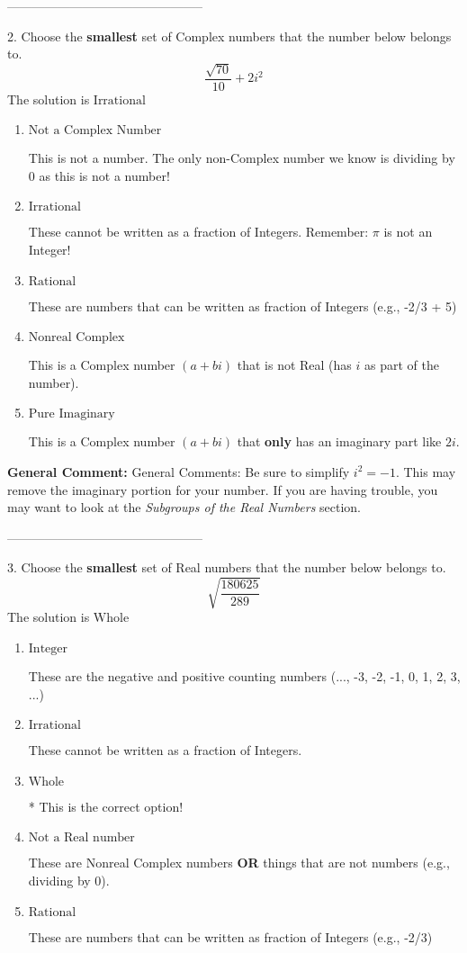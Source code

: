 \documentclass{extbook}[14pt]
\begin{document}
-----------------------------------------------

2. Choose the \textbf{smallest} set of Complex numbers that the number below belongs to.
\[ \frac{\sqrt{70}}{10}+2i^2 \] 
The solution is $ \text{Irrational} $ 

\begin{enumerate}[label=\Alph*.] 
\item $ \text{Not a Complex Number} $ 

 This is not a number. The only non-Complex number we know is dividing by 0 as this is not a number! 
\item $ \text{Irrational} $ 

 These cannot be written as a fraction of Integers. Remember: $\pi$ is not an Integer! 
\item $ \text{Rational} $ 

 These are numbers that can be written as fraction of Integers (e.g., -2/3 + 5) 
\item $ \text{Nonreal Complex} $ 

 This is a Complex number $(a+bi)$ that is not Real (has $i$ as part of the number). 
\item $ \text{Pure Imaginary} $ 

 This is a Complex number $(a+bi)$ that \textbf{only} has an imaginary part like $2i$. 
\end{enumerate} 
 
\textbf{General Comment:} General Comments: Be sure to simplify $i^2 = -1$. This may remove the imaginary portion for your number. If you are having trouble, you may want to look at the \textit{Subgroups of the Real Numbers} section. 

-----------------------------------------------

3. Choose the \textbf{smallest} set of Real numbers that the number below belongs to.
\[ \sqrt{\frac{180625}{289}} \] 
The solution is $ \text{Whole} $ 

\begin{enumerate}[label=\Alph*.] 
\item $ \text{Integer} $ 

 These are the negative and positive counting numbers (..., -3, -2, -1, 0, 1, 2, 3, ...) 
\item $ \text{Irrational} $ 

 These cannot be written as a fraction of Integers. 
\item $ \text{Whole} $ 

 * This is the correct option! 
\item $ \text{Not a Real number} $ 

 These are Nonreal Complex numbers \textbf{OR} things that are not numbers (e.g., dividing by 0). 
\item $ \text{Rational} $ 

 These are numbers that can be written as fraction of Integers (e.g., -2/3) 
\end{enumerate} 
 
\end{document}
